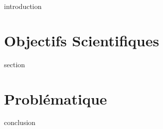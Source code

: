 
\chaptertoc{}

\label{sec:2-int}
{introduction}

\section{Objectifs Scientifiques}
\label{sec:2-1}
{section}

\section{Problématique}
\label{sec:2-2}


\label{sec:2-cnc}
{conclusion}


